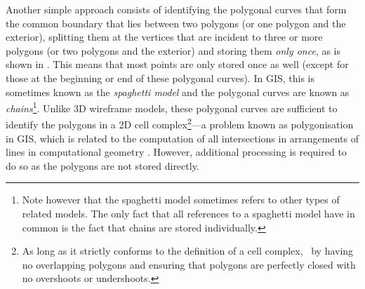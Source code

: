 Another simple approach consists of identifying the polygonal curves that form the common boundary that lies between two polygons (or one polygon and the exterior), splitting them at the vertices that are incident to three or more polygons (or two polygons and the exterior) and storing them \emph{only once}, as is shown in .
This means that most points are only stored once as well (except for those at the beginning or end of these polygonal curves).
In GIS, this is sometimes known as the \emph{spaghetti model} and the polygonal curves are known as \emph{chains}\footnote{Note however that the spaghetti model sometimes refers to other types of related models.
The only fact that all references to a spaghetti model have in common is the fact that chains are stored individually.}.
Unlike 3D wireframe models, these polygonal curves are sufficient to identify the polygons in a 2D cell complex\footnote{As long as it strictly conforms to the definition of a cell complex, \eg\ by having no overlapping polygons and ensuring that polygons are perfectly closed with no overshoots or undershoots.}---a problem known as polygonisation in GIS, which is related to the computation of all intersections in arrangements of lines in computational geometry \citep[Ch.~8]{deBerg08}.
However, additional processing is required to do so as the polygons are not stored directly.

